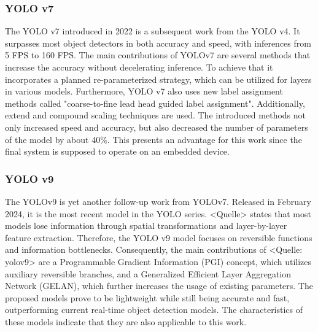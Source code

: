 \subsubsection{YOLO v7}
\label{subsubsec: YOLO v7}

The YOLO v7 introduced in 2022 is a subsequent work from the YOLO v4.
It surpasses most object detectors in both accuracy and speed, with inferences from 5 FPS to 160 FPS.
The main contributions of YOLOv7 are several methods that increase the accuracy without decelerating inference.
To achieve that it incorporates a planned re-parameterized strategy, which can be utilized for layers in various models.
Furthermore, YOLO v7 also uses new label assignment methods called "coarse-to-fine lead head guided label assignment".
Additionally, extend and compound scaling techniques are used.
The introduced methods not only increased speed and accuracy, but also decreased the number of parameters of the model by about 40\%.
This presents an advantage for this work since the final system is supposed to operate on an embedded device.

\subsubsection{YOLO v9}
\label{subsubsec:YOLOv9}

The YOLOv9 is yet another follow-up work from YOLOv7.
Released in February 2024, it is the most recent model in the YOLO series.
<Quelle> states that most models lose information through spatial transformations and layer-by-layer feature extraction.
Therefore, the YOLO v9 model focuses on reversible functions and information bottlenecks.
Consequently, the main contributions of <Quelle: yolov9> are a Programmable Gradient Information (PGI) concept, which utilizes auxiliary reversible branches, and a Generalized Efficient Layer Aggregation Network (GELAN), which further increases the usage of existing parameters.
The proposed models prove to be lightweight while still being accurate and fast, outperforming current real-time object detection models.
The characteristics of these models indicate that they are also applicable to this work.
